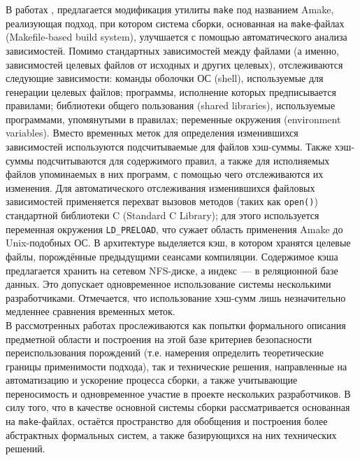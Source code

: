 В работах \cite{amake2012}, \cite{amake2013} предлагается модификация утилиты \texttt{make} под названием Amake, реализующая подход, при котором система сборки, основанная на \texttt{make}-файлах (Makefile-based build system), улучшается с помощью автоматического анализа зависимостей. Помимо стандартных зависимостей между файлами (а именно, зависимостей целевых файлов от исходных и других целевых), отслеживаются следующие зависимости: команды оболочки ОС (shell), используемые для генерации целевых файлов; программы, исполнение которых предписывается правилами; библиотеки общего пользования (shared libraries), используемые программами, упомянутыми в правилах; переменные окружения (environment variables). Вместо временных меток для определения изменившихся зависимостей используются подсчитываемые для файлов хэш-суммы. Также хэш-суммы подсчитываются для содержимого правил, а также для исполняемых файлов упоминаемых в них программ, с помощью чего отслеживаются их изменения. Для автоматического отслеживания изменившихся файловых зависимостей применяется перехват вызовов методов (таких как \texttt{open()}) стандартной библиотеки C (Standard C Library); для этого используется переменная окружения \texttt{LD\_PRELOAD}, что сужает область применения Amake до Unix-подобных ОС. В архитектуре выделяется кэш, в котором хранятся целевые файлы, порождённые предыдущими сеансами компиляции. Содержимое кэша предлагается хранить на сетевом NFS-диске, а индекс~--- в реляционной базе данных. Это допускает одновременное использование системы несколькими разработчиками. Отмечается, что использование хэш-сумм лишь незначительно медленнее сравнения временных меток.\\

В рассмотренных работах прослеживаются как попытки формального описания предметной области и построения на этой базе критериев безопасности переиспользования порождений (т.е. намерения определить теоретические границы применимости подхода), так и технические решения, направленные на автоматизацию и ускорение процесса сборки, а также учитывающие переносимость и одновременное участие в проекте нескольких разработчиков. В силу того, что в качестве основной системы сборки рассматривается основанная на \texttt{make}-файлах, остаётся пространство для обобщения и построения более абстрактных формальных систем, а также базирующихся на них технических решений.